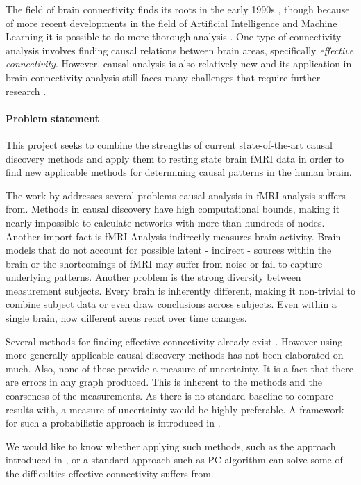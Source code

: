 \documentclass[a4paper, 10pt, english, twocolumn]{article}
\begin{document}
The field of brain connectivity finds its roots in the early 1990s \cite{friston1993functional, friston1994}, though because of more recent developments in the field of Artificial Intelligence and Machine Learning it is possible to do more thorough analysis \cite{vandenheuvel2010}.
One type of connectivity analysis involves finding causal relations between brain areas, specifically \emph{effective connectivity}.
However, causal analysis is also relatively new and its application in brain connectivity analysis still faces many challenges that require further research \cite{ramsey2010}.

\paragraph{Problem statement}
This project seeks to combine the strengths of current state-of-the-art causal discovery methods and apply them to resting state brain fMRI data in order to find new applicable methods for determining causal patterns in the human brain.

The work by \cite{ramsey2010} addresses several problems causal analysis in fMRI analysis suffers from.
Methods in causal discovery have high computational bounds, making it nearly impossible to calculate networks with more than hundreds of nodes.
Another import fact is fMRI Analysis indirectly measures brain activity.
Brain models that do not account for possible latent - indirect - sources within the brain or the shortcomings of fMRI may suffer from noise or fail to capture underlying patterns.
Another problem is the strong diversity between measurement subjects.
Every brain is inherently different, making it non-trivial to combine subject data or even draw conclusions across subjects.
Even within a single brain, how different areas react over time changes.

Several methods for finding effective connectivity already exist \cite{mclntosh1994, harrison2003, friston2003, roebroeck2005}.
However using more generally applicable causal discovery methods has not been elaborated on much.
Also, none of these provide a measure of uncertainty.
It is a fact that there are errors in any graph produced.
This is inherent to the methods and the coarseness of the measurements.
As there is no standard baseline to compare results with, a measure of uncertainty would be highly preferable.
A framework for such a probabilistic approach is introduced in \cite{claassen2012}.

We would like to know whether applying such methods, such as the approach introduced in \cite{claassen2012}, or a standard approach such as PC-algorithm \cite{spirtes2000} can solve some of the difficulties effective connectivity suffers from.
\end{document}

